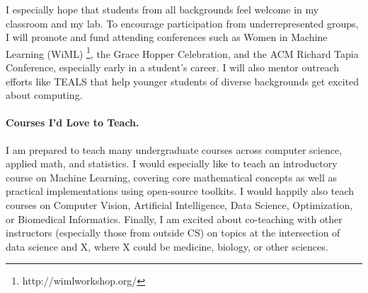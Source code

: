 \documentclass[11pt,letterpaper]{article}
\begin{document}
I especially hope that students from all backgrounds feel welcome in my classroom and my lab. To encourage participation from underrepresented groups, I will promote and fund attending conferences such as Women in Machine Learning (WiML) \footnote{http://wimlworkshop.org/}, the Grace Hopper Celebration, and the ACM Richard Tapia Conference, especially early in a student's career. I will also mentor outreach efforts like TEALS that help younger students of diverse backgrounds get excited about computing.




\paragraph{Courses I'd Love to Teach.}
I am prepared to teach many undergraduate courses across computer science, applied math, and statistics. I would especially like to teach an introductory course on Machine Learning, covering core mathematical concepts as well as practical implementations using open-source toolkits. I would happily also teach courses on Computer Vision, Artificial Intelligence, Data Science, Optimization, or Biomedical Informatics. 
Finally, I am excited about co-teaching with other instructors (especially those from outside CS) on topics at the intersection of data science and X, where X could be medicine, biology, or other sciences.
\end{document}
